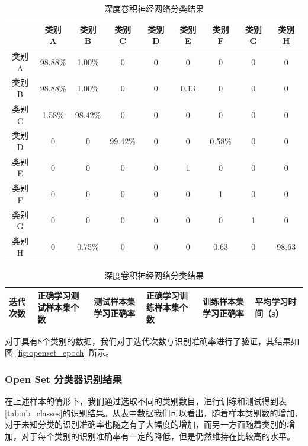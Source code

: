 \begin{table}[H]
	\renewcommand{\arraystretch}{1.3}
	\caption{深度卷积神经网络分类结果}
	\centering
	\begin{tabular}{ccccccccc}
		\hline
		 & 类别 A & 类别 B & 类别 C & 类别 D & 类别 E & 类别 F & 类别 G & 类别 H \\
		 \hline
		  类别 A & 98.88\% & 1.00\% & 0 & 0 & 0 & 0 & 0 & 0 \\
		 类别 B & 98.88\% & 1.00\% & 0 & 0 & 0.13 & 0 & 0 & 0 \\
		 类别 C & 1.58\% & 98.42\% & 0 & 0 & 0 & 0 & 0 & 0 \\
		 类别 D & 0 & 0 & 99.42\% & 0 & 0 & 0.58\% & 0 & 0 \\
		 类别 E & 0 & 0 & 0 & 0 & 1 & 0 & 0 & 0 \\
		 类别 F & 0 & 0 & 0 & 0 & 0 & 1 & 0 & 0 \\
		 类别 G & 0 & 0 & 0 & 0 & 0 & 0 & 1 & 0 \\
		 类别 H & 0 & 0.75\% & 0 & 0 & 0 & 0.63 & 0 & 98.63 \\
		\hline
	\end{tabular}
\end{table}

\begin{table}[H]
	\renewcommand{\arraystretch}{1.3}
	\caption{深度卷积神经网络分类结果}
	\centering
	\begin{tabular}{p{1.5cm}p{2.6cm}p{2.6cm}p{2.6cm}p{2.6cm}p{1.6cm}}
		\hline
		 迭代次数 & 正确学习测试样本集个数 & 测试样本集学习正确率 & 正确学习训练样本集个数 & 训练样本集学习正确率 & 平均学习时间（s） \\
		 \hline	
		
		\hline
	\end{tabular}
\end{table}


对于具有8个类别的数据，我们对于迭代次数与识别准确率进行了验证，其结果如图 \ref{fig:openset_epoch} 所示。
\subsubsection{Open Set 分类器识别结果}

在上述样本的情形下，我们通过选取不同的类别数目，进行训练和测试得到表\ref{tab:nb_classes}的识别结果。从表中数据我们可以看出，随着样本类别数的增加，对于未知分类的识别准确率也随之有了大幅度的增加，而另一方面随着类别的增加，对于每个类别的识别准确率有一定的降低，但是仍然维持在比较高的水平。


